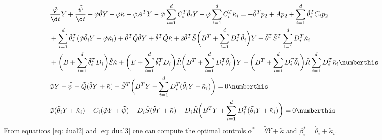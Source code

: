 \begin{align*}
    &\frac{\tilde{\varphi}}{\d t}Y + \frac{\tilde{\psi}}{\d t} + \tilde{\varphi} \tilde{\theta} Y + \tilde{\varphi} \tilde{\kappa} - \tilde{\varphi} A^T Y - \tilde{\varphi} \sum_{i=1}^d C_i^T \tilde{\theta}_i Y - \tilde{\varphi} \sum_{i=1}^d C_i^T \tilde{\kappa}_i = -\tilde{\theta}^T p_2 + A p_2 + \sum_{i=1}^d \tilde{\theta}_i^T C_i p_2\\
    &+ \sum_{i=1}^d \tilde{\theta}_i^T (\tilde{\varphi} \tilde{\theta}_i Y + \tilde{\varphi} \tilde{\kappa}_i) + \tilde{\theta}^T \tilde{Q}\tilde{\theta} Y + \tilde{\theta}^T \tilde{Q} \tilde{\kappa} + 2 \tilde{\theta}^T \tilde{S}\bigg(B^T + \sum_{i=1}^d D_i^T \tilde{\theta}_i\bigg) Y + \tilde{\theta}^T \tilde{S}^T \sum_{i=1}^d D_i^T \tilde{\kappa}_i\\
    &+ \bigg( B + \sum_{i=1}^d \tilde{\theta}_i^T D_i \bigg) \tilde{S} \tilde{\kappa}    + \bigg(B + \sum_{i=1}^d \tilde{\theta}_i^T D_i \bigg) \tilde{R} \bigg(B^T + \sum_{i=1}^d D_i^T \tilde{\theta}_i\bigg) Y + \bigg(B^T + \sum_{i=1}^d D_i^T \tilde{\theta}_i\bigg) \tilde{R}\sum_{i=1}^d D_i^T \tilde{\kappa}_i \numberthis \label{eq: dual1}\\
    &\tilde{\varphi} Y + \tilde{\psi} - \tilde{Q}(\tilde{\theta} Y + \tilde{\kappa}) - \tilde{S}^T \bigg(B^T Y + \sum_{i=1}^d D_i^T (\tilde{\theta}_i Y + \tilde{\kappa}_i)\bigg)= 0\numberthis \label{eq: dual2}\\
    &\tilde{\varphi}( \tilde{\theta}_i Y +  \tilde{\kappa}_i) - C_i (\tilde{\varphi} Y + \tilde{\psi}) - D_i \tilde{S}(\tilde{\theta} Y + \tilde{\kappa}) - D_i \tilde{R}\bigg(B^T Y + \sum_{i=1}^d D_i^T (\tilde{\theta}_iY + \tilde{\kappa}_i)\bigg) = 0 \numberthis \label{eq: dual3}
\end{align*}
From equations \eqref{eq: dual2} and \eqref{eq: dual3} one can compute the optimal controls $\alpha^\ast = \tilde{\theta}Y + \tilde{\kappa}$ and $\beta_i^\ast = \tilde{\theta}_i + \tilde{\kappa}_i$. 
